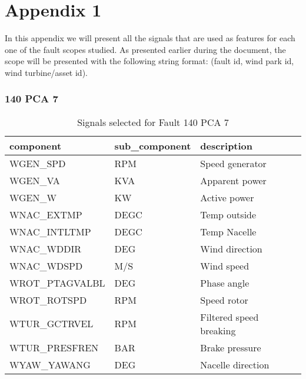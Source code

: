 

\chapter{Appendix 1}
\label{appendix1}

In this appendix we will present all the signals that are used as features for each one of the fault scopes studied. As presented earlier during the document, the scope will be presented with the following string format: (fault id, wind park id, wind turbine/asset id).

\subsection{140 PCA 7}

\begin{table}[!ht]
    \centering
    \begin{tabular}{|l|l|l|}
    \hline
        component & sub\_component & description \\ \hline
        WGEN\_SPD & RPM & Speed generator \\ \hline
        WGEN\_VA & KVA & Apparent power \\ \hline
        WGEN\_W & KW & Active power \\ \hline
        WNAC\_EXTMP & DEGC & Temp outside \\ \hline
        WNAC\_INTLTMP & DEGC & Temp Nacelle \\ \hline
        WNAC\_WDDIR & DEG & Wind direction \\ \hline
        WNAC\_WDSPD & M/S & Wind speed \\ \hline
        WROT\_PTAGVALBL & DEG & Phase angle \\ \hline
        WROT\_ROTSPD & RPM & Speed rotor \\ \hline
        WTUR\_GCTRVEL & RPM & Filtered speed breaking \\ \hline
        WTUR\_PRESFREN & BAR & Brake pressure \\ \hline
        WYAW\_YAWANG & DEG & Nacelle direction \\ \hline
    \end{tabular}
    \caption{Signals selected for Fault 140 PCA 7}
\end{table}


